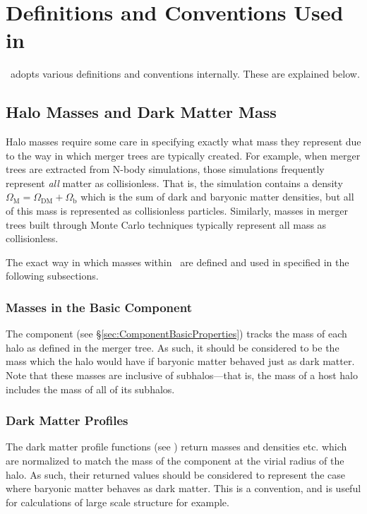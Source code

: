 \chapter{Definitions and Conventions Used in \glc}

\glc\ adopts various definitions and conventions internally. These are explained below.

\section{Halo Masses and Dark Matter Mass}

Halo masses require some care in specifying exactly what mass they represent due to the way in which merger trees are typically created. For example, when merger trees are extracted from N-body simulations, those simulations frequently represent \emph{all} matter as collisionless. That is, the simulation contains a density $\Omega_\mathrm{M}=\Omega_\mathrm{DM}+\Omega_\mathrm{b}$ which is the sum of dark and baryonic matter densities, but all of this mass is represented as collisionless particles. Similarly, masses in merger trees built through Monte Carlo techniques typically represent all mass as collisionless.

The exact way in which masses within \glc\ are defined and used in specified in the following subsections.

\subsection{Masses in the Basic Component}

The  component (see \S\ref{sec:ComponentBasicProperties}) tracks the mass of each halo as defined in the merger tree. As such, it should be considered to be the mass which the halo would have if baryonic matter behaved just as dark matter. Note that these masses are inclusive of subhalos---that is, the mass of a host halo includes the mass of all of its subhalos.

\subsection{Dark Matter Profiles}

The dark matter profile functions (see ) return masses and densities etc. which are normalized to match the mass of the  component at the virial radius of the halo. As such, their returned values should be considered to represent the case where baryonic matter behaves as dark matter. This is a convention, and is useful for calculations of large scale structure for example.

